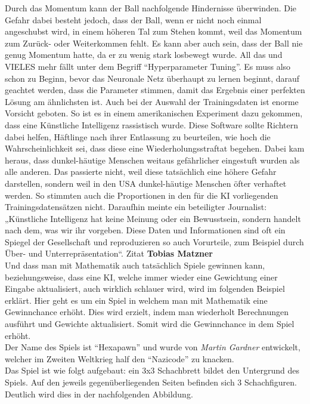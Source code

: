 Durch das Momentum kann der Ball nachfolgende Hindernisse überwinden. Die Gefahr dabei besteht jedoch, dass der Ball, wenn er nicht noch einmal angeschubst wird, in einem höheren Tal zum Stehen kommt, weil das Momentum zum Zurück- oder Weiterkommen fehlt. Es kann aber auch sein, dass der Ball nie genug Momentum hatte, da er zu wenig stark losbewegt wurde. All das und VIELES mehr fällt unter dem Begriff ``Hyperparameter Tuning''. Es muss also schon zu Beginn, bevor das Neuronale Netz überhaupt zu lernen beginnt, darauf geachtet werden, dass die Parameter stimmen, damit das Ergebnis einer perfekten Lösung am ähnlichsten ist.
Auch bei der Auswahl der Trainingsdaten ist enorme Vorsicht geboten. So ist es in einem amerikanischen Experiment dazu gekommen, dass eine Künstliche Intelligenz rassistisch wurde. Diese Software sollte Richtern dabei helfen, Häftlinge nach ihrer Entlassung zu beurteilen, wie hoch die Wahrscheinlichkeit sei, dass diese eine Wiederholungsstraftat begehen. Dabei kam heraus, dass dunkel-häutige Menschen weitaus gefährlicher eingestuft wurden als alle anderen. Das passierte nicht, weil diese tatsächlich eine höhere Gefahr darstellen, sondern weil in den USA dunkel-häutige Menschen öfter verhaftet werden. So stimmten auch die Proportionen in den für die KI vorliegenden Trainingsdatensätzen nicht. Daraufhin meinte ein beteiligter Journalist: „Künstliche Intelligenz hat keine Meinung oder ein Bewusstsein, sondern handelt nach dem, was wir ihr vorgeben. Diese Daten und Informationen sind oft ein Spiegel der Gesellschaft und reproduzieren so auch Vorurteile, zum Beispiel durch Über- und Unterrepräsentation“.
Zitat \textbf{Tobias Matzner}
\\
Und dass man mit Mathematik auch tatsächlich Spiele gewinnen kann, beziehungsweise, dass eine KI, welche immer wieder eine Gewichtung einer Eingabe aktualisiert, auch wirklich schlauer wird, wird im folgenden Beispiel erklärt. Hier geht es um ein Spiel in welchem man mit Mathematik eine Gewinnchance erhöht. Dies wird erzielt, indem man wiederholt Berechnungen ausführt und Gewichte aktualisiert. Somit wird die Gewinnchance in dem Spiel erhöht.
\\
Der Name des Spiels ist ``Hexapawn'' und wurde von \textit{Martin Gardner} entwickelt, welcher im Zweiten Weltkrieg half den ``Nazicode'' zu knacken.
\\
Das Spiel ist wie folgt aufgebaut: ein 3x3 Schachbrett bildet den Untergrund des Spiels. Auf den jeweils gegenüberliegenden Seiten befinden sich 3 Schachfiguren. Deutlich wird dies in der nachfolgenden Abbildung.


